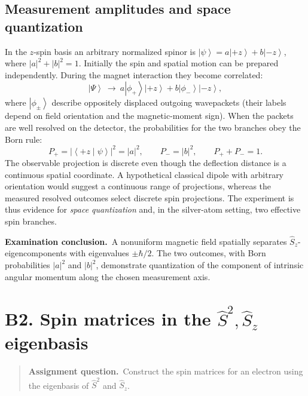 \documentclass[11pt,a4paper]{article}
\theoremstyle{definition}
\newcommand{\ket}[1]{\left|#1\right\rangle}
\newcommand{\ip}[2]{\left\langle#1\middle|#2\right\rangle}
\newenvironment{question}{\begin{quote}\small\noindent\textbf{Assignment question.}\ }{\end{quote}}
\newcommand{\exam}[1]{\par\medskip\noindent\textbf{Examination conclusion.}\ #1\par}
\begin{document}
\subsection{Measurement amplitudes and space quantization}
In the \(z\)-spin basis an arbitrary normalized spinor is \(\ket\psi=a\ket{+z}+b\ket{-z}\), where \(|a|^2+|b|^2=1\). Initially the spin and spatial motion can be prepared independently. During the magnet interaction they become correlated:
\begin{equation}
\ket\Psi\ \longrightarrow\ a\ket{\phi_+}\ket{+z}+b\ket{\phi_-}\ket{-z},
\end{equation}
where \(\ket{\phi_\pm}\) describe oppositely displaced outgoing wavepackets (their labels depend on field orientation and the magnetic-moment sign). When the packets are well resolved on the detector, the probabilities for the two branches obey the Born rule:
\begin{equation}
\boxed{P_+=|\ip{+z}{\psi}|^2=|a|^2,\qquad P_-=|b|^2,\qquad P_++P_-=1.}
\end{equation}
The observable projection is discrete even though the deflection distance is a continuous spatial coordinate. A hypothetical classical dipole with arbitrary orientation would suggest a continuous range of projections, whereas the measured resolved outcomes select discrete spin projections. The experiment is thus evidence for \emph{space quantization} and, in the silver-atom setting, two effective spin branches.
\exam{A nonuniform magnetic field spatially separates \(\hat S_z\)-eigencomponents with eigenvalues \(\pm\hbar/2\). The two outcomes, with Born probabilities \(|a|^2\) and \(|b|^2\), demonstrate quantization of the component of intrinsic angular momentum along the chosen measurement axis.}

\section{B2. Spin matrices in the \(\hat S^2,\hat S_z\) eigenbasis}
\begin{question}Construct the spin matrices for an electron using the eigenbasis of \(\hat S^2\) and \(\hat S_z\).\end{question}
\end{document}
